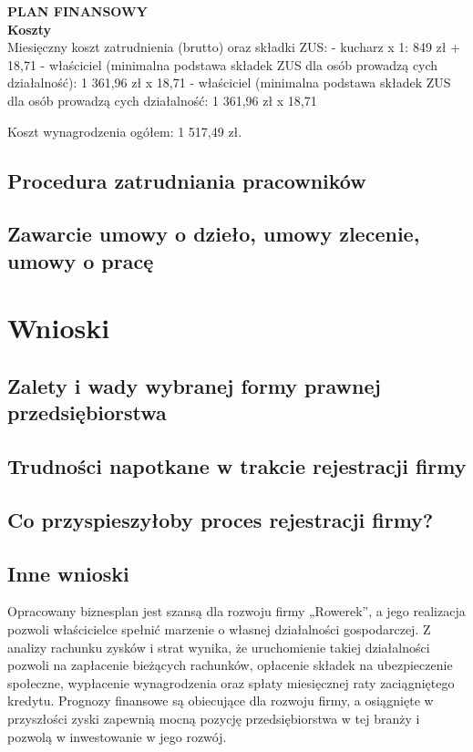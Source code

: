 \documentclass{sprawozdanie-agh}
\begin{document}
		\textbf{PLAN FINANSOWY}\\
		\textbf{Koszty}\\
		Miesięczny koszt zatrudnienia (brutto) oraz składki ZUS: 
		- kucharz x 1:
		849 zł + 18,71%
		-	właściciel (minimalna podstawa składek ZUS dla osób prowadzą
		cych działalność):
		1 361,96 zł x 18,71%
		-	właściciel (minimalna podstawa składek ZUS dla osób prowadzą
		cych działalność:
		1 361,96 zł x 18,71%
		
		Koszt wynagrodzenia ogółem:		  1 517,49 zł.
		
		\subsection{Procedura zatrudniania pracowników}
		\subsection{Zawarcie umowy o dzieło, umowy zlecenie, umowy o pracę}

	\section{Wnioski} 

		\subsection{Zalety i wady wybranej formy prawnej przedsiębiorstwa}
		\subsection{Trudności napotkane w trakcie rejestracji firmy}
		\subsection{Co przyspieszyłoby proces rejestracji firmy?}
		\subsection{Inne wnioski}
		
		Opracowany biznesplan jest szansą dla rozwoju firmy „Rowerek”, a jego realizacja pozwoli właścicielce spełnić marzenie o własnej działalności gospodarczej. Z analizy rachunku zysków i strat wynika, że uruchomienie takiej działalności pozwoli na zapłacenie bieżących rachunków, opłacenie składek na ubezpieczenie społeczne, wypłacenie wynagrodzenia oraz spłaty miesięcznej raty zaciągniętego kredytu. Prognozy finansowe są obiecujące dla rozwoju firmy, a osiągnięte w przyszłości zyski zapewnią mocną pozycję przedsiębiorstwa w tej branży i pozwolą w inwestowanie w jego rozwój.
		
\end{document}
